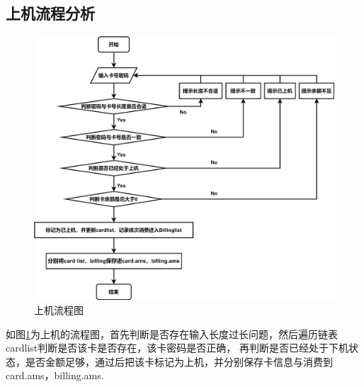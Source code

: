 \documentclass{article}
\begin{document}
    \subsection{上机流程分析}
    \begin{figure}[h]
        \centering
        \includegraphics[scale=0.115]{figure/logon_pic.png}
        \caption{上机流程图}
        \label{logon_pic}
    \end{figure}
    如图\ref{logon_pic}为上机的流程图，首先判断是否存在输入长度过长问题，然后遍历链表cardlist判断是否该卡是否存在，该卡密码是否正确，
    再判断是否已经处于下机状态，是否金额足够，通过后把该卡标记为上机，并分别保存卡信息与消费到card.ams，billing.ams.
    \newpage
\end{document}

